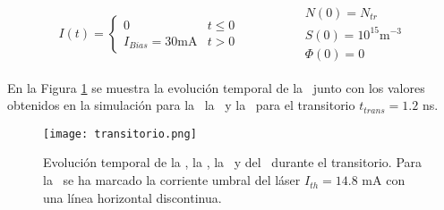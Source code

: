 		\begin{equation}
			\begin{matrix}
					I(t) = \left\{\begin{matrix}
									0 & t \leq 0\\ 
									I_{Bias} = 30 \textrm{mA} & t > 0
							\end{matrix}\right.
					& & & & & & 
					\begin{matrix}
						N(0) = N_{tr} \\ S(0) = 10^{15} \textrm{m}^{-3}\\ \Phi(0) = 0
					\end{matrix}
				\end{matrix}
			\label{eq:transient}
		\end{equation}

	En la Figura \ref{Img:transitorio} se muestra la evoluci\'on temporal de la \I\ junto con los valores obtenidos en la simulaci\'on para la \n\, la \s\ y la \fase\ para el transitorio $t_{trans} = 1.2$ ns.

		\begin{figure}[H]
			\centering
			\texttt{[image: transitorio.png]}
			\caption{\label{Img:transitorio}Evoluci\'on temporal de la \I, la \s, la \n\ y del \chirp\ durante el transitorio. Para la \I\ se ha marcado la corriente umbral del l\'aser $I_{th} = 14.8$ mA con una l\'inea horizontal discontinua.}	
		\end{figure}
		

